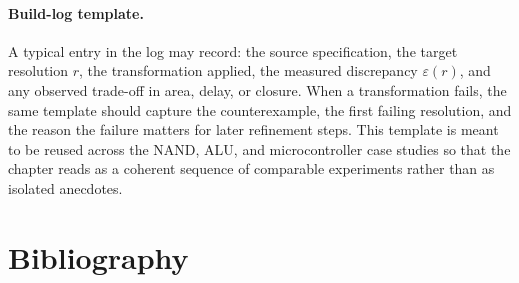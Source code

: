 \documentclass[11pt]{article}
\begin{document}
\paragraph{Build-log template.}
A typical entry in the log may record: the source specification, the target resolution \(r\), the transformation applied, the measured discrepancy \(\varepsilon(r)\), and any observed trade-off in area, delay, or closure. When a transformation fails, the same template should capture the counterexample, the first failing resolution, and the reason the failure matters for later refinement steps. This template is meant to be reused across the NAND, ALU, and microcontroller case studies so that the chapter reads as a coherent sequence of comparable experiments rather than as isolated anecdotes.


\section{Bibliography}
\end{document}
